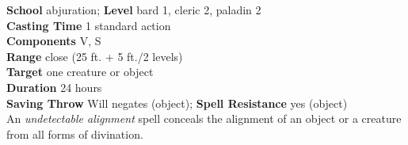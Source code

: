 \textbf{School} abjuration; \textbf{Level} bard 1, cleric 2, paladin 2\\
\textbf{Casting Time} 1 standard action\\
\textbf{Components} V, S\\
\textbf{Range} close (25 ft. + 5 ft./2 levels)\\
\textbf{Target} one creature or object\\
\textbf{Duration} 24 hours\\
\textbf{Saving Throw }Will negates (object); \textbf{Spell Resistance} yes (object)\\
An \textit{undetectable alignment }spell conceals the alignment of an object or a creature from all forms of divination.\\
